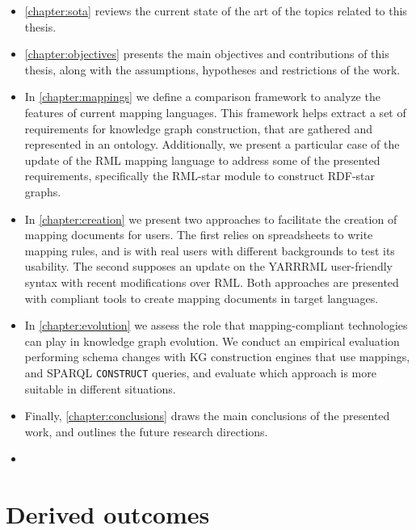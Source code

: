 \begin{itemize}
    \item \cref{chapter:sota} reviews the current state of the art of the topics related to this thesis. 
    
    \item \cref{chapter:objectives} presents the main objectives and contributions of this thesis, along with the assumptions, hypotheses and restrictions of the work. 
    
    \item In \cref{chapter:mappings} we define a comparison framework to analyze the features of current mapping languages. This framework helps extract a set of requirements for knowledge graph construction, that are gathered and represented in an ontology. Additionally, we present a particular case of the update of the RML mapping language to address some of the presented requirements, specifically the RML-star module to construct RDF-star graphs.
    
    \item In \cref{chapter:creation} we present two approaches to facilitate the creation of mapping documents for users. The first relies on spreadsheets to write mapping rules, and is with real users with different backgrounds to test its usability. The second supposes an update on the YARRRML user-friendly syntax with recent modifications over RML. Both approaches are presented with compliant tools to create mapping documents in target languages. 
    
    \item In \cref{chapter:evolution} we assess the role that mapping-compliant technologies can play in knowledge graph evolution. We conduct an empirical evaluation performing schema changes with KG construction engines that use mappings, and SPARQL \texttt{CONSTRUCT} queries, and evaluate which approach is more suitable in different situations. 
    
    \item Finally, \cref{chapter:conclusions} draws the main conclusions of the presented work, and outlines the future research directions. 
    
    \item {}
\end{itemize}


\section{Derived outcomes}

